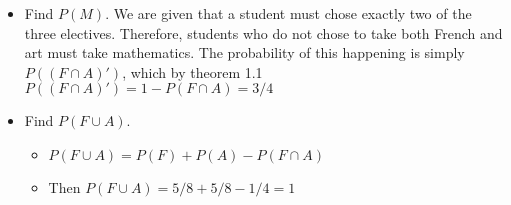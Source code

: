 \documentclass{article}
\begin{document}
\begin{enumerate}
    \begin{itemize}
    \item Find $P(M)$. We are given that a student must chose exactly two of the three electives. Therefore, students who do not chose to take both French and art must take mathematics. The probability of this happening is simply $P((F \cap A)')$, which by theorem 1.1 $P((F \cap A)') = 1 - P(F \cap A) = 3/4$
    \item Find $P(F \cup A)$.
        \begin{itemize}
        \item $P(F \cup A) = P(F) + P(A) - P(F \cap A)$
        \item Then $P(F \cup A) = 5/8 + 5/8 - 1/4 = 1$
        \end{itemize}
    \end{itemize}
\end{enumerate}
\end{document}
